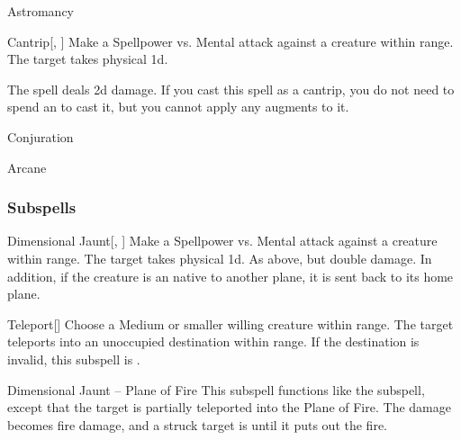 \newpage
\begin{spellsection}{Astromancy}

\begin{spellheader}
\end{spellheader}


\begin{ability}{Cantrip}[, ]
Make a Spellpower vs. Mental attack against a creature within \rngmed range.
\hit The target takes physical  \minus1d.
\end{ability}



 The spell deals \minus2d damage. If you cast this spell as a cantrip,
you do not need to spend an  to cast it,
but you cannot apply any augments to it.


 Conjuration

 Arcane
\end{spellsection}


\subsubsection{Subspells}


\begin{ability}[\nth{1}]{Dimensional Jaunt}[, ]
Make a Spellpower vs. Mental attack against a creature within \rngmed range.
\hit The target takes physical  \plus1d.
\crit As above, but double damage.
In addition, if the creature is an  native to another plane, it is sent back to its home plane.
\end{ability}
\vspace{0.25em}


\begin{ability}[\nth{1}]{Teleport}[]
Choose a Medium or smaller willing creature within \rngclose range.
The target teleports into an unoccupied destination within range.
If the destination is invalid, this subspell is .
\end{ability}
\vspace{0.25em}


\begin{ability}[\nth{2}]{Dimensional Jaunt -- Plane of Fire}
This subspell functions like the  subspell, except that the target is partially teleported into the Plane of Fire.
The damage becomes fire damage, and a struck target is  until it puts out the fire.
\end{ability}
\vspace{0.25em}


